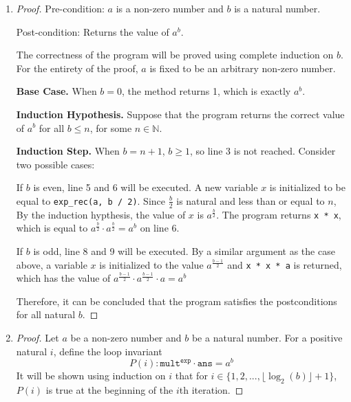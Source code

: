 \documentclass[11pt]{article}
\begin{document}
    \begin{enumerate}[label=(\alph*)]
        \item 
        \begin{proof}
            Pre-condition: \(a\) is a non-zero number and \(b\) is a natural number.
            
            Post-condition: Returns the value of \(a^b\).

            The correctness of the program will be proved using complete induction on \(b\). For the entirety of the proof, \(a\) is fixed to be an arbitrary non-zero number.

            \textbf{Base Case.} When \(b=0\), the method returns 1, which is exactly \(a^b\).

            \textbf{Induction Hypothesis.} Suppose that the program returns the correct value of \(a^b\) for all \(b \leq n\), for some \(n \in \mathbb{N}\).

            \textbf{Induction Step.} When \(b = n+1\), \(b \geq 1\), so line 3 is not reached. Consider two possible cases:
            
            If \(b\) is even, line 5 and 6 will be executed. A new variable \(x\) is initialized to be equal to \verb|exp_rec(a, b / 2)|. Since \(\frac{b}{2}\) is natural and less than or equal to \(n\), By the induction hypthesis, the value of \(x\) is \(a^{\frac{b}{2}}\). The program returns \verb|x * x|, which is equal to \(a^{\frac{b}{2}} \cdot a^{\frac{b}{2}} = a^b\) on line 6. 

            If \(b\) is odd, line 8 and 9 will be executed. By a similar argument as the case above, a variable \(x\) is initialized to the value \(a^{\frac{b-1}{2}}\) and \verb|x * x * a| is returned, which has the value of \(a^{\frac{b-1}{2}} \cdot a^{\frac{b-1}{2}} \cdot a = a^b\)

            Therefore, it can be concluded that the program satisfies the postconditions for all natural \(b\).

        \end{proof}

        \item 
        \begin{proof}
            Let \(a\) be a non-zero number and \(b\) be a natural number. For a positive natural \(i\), define the loop invariant
            \[
                P(i) : \texttt{mult}^\texttt{exp} \cdot \texttt{ans} = a^b
            \]
            It will be shown using induction on \(i\) that for \(i \in \{1, 2,..., \lfloor \log _2 (b) \rfloor + 1\}\), \(P(i)\) is true at the beginning of the \(i\)th iteration.


\end{proof}
\end{enumerate}
\end{document}
